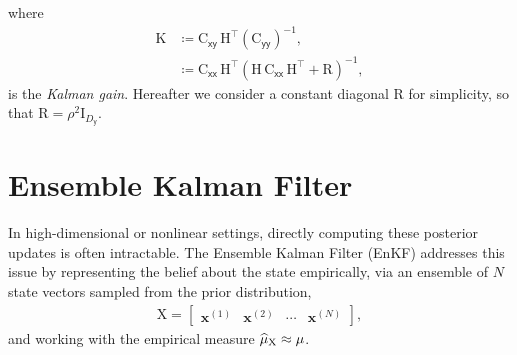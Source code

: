 \documentclass[wcp]{jmlr} %
\newcommand{\vv}[1]{\boldsymbol{#1}}
\newcommand{\mm}[1]{\mathrm{#1}}
\newcommand{\rv}[1]{\mathsf{#1}}
\newcommand{\vrv}[1]{\vv{\rv{#1}}}
\begin{document}
where
\begin{align}
\mm{K}
&\coloneq \mm{C}_{\vrv{xy}}\,\mm{H}^\top \left(\mm{C}_{\vrv{yy}}\right)^{-1},\label{eq:kalman-gain}\\
&\coloneq \mm{C}_{\vrv{xx}}\,\mm{H}^\top \left(\mm{H}\,\mm{C}_{\vrv{xx}}\,\mm{H}^\top + \mm{R}\right)^{-1},
\end{align}
is the \emph{Kalman gain}.
Hereafter we consider a constant diagonal \(\mm{R}\) for simplicity, so that \(\mm{R}=\rho^2\mm{I}_{D_{\vrv{y}}}\).

\section{Ensemble Kalman Filter}

In high-dimensional or nonlinear settings, directly computing these posterior updates is often intractable.
The Ensemble Kalman Filter (EnKF) addresses this issue by representing the belief about the state empirically, via an ensemble of \(N\) state vectors sampled from the prior distribution,
\begin{align}
    \mm{X} = \begin{bmatrix} \vv{x}^{(1)} & \vv{x}^{(2)} & \cdots & \vv{x}^{(N)} \end{bmatrix},
\end{align}
and working with the empirical measure $\ELaw[\mm{X}]\approx \Law$.
\end{document}
